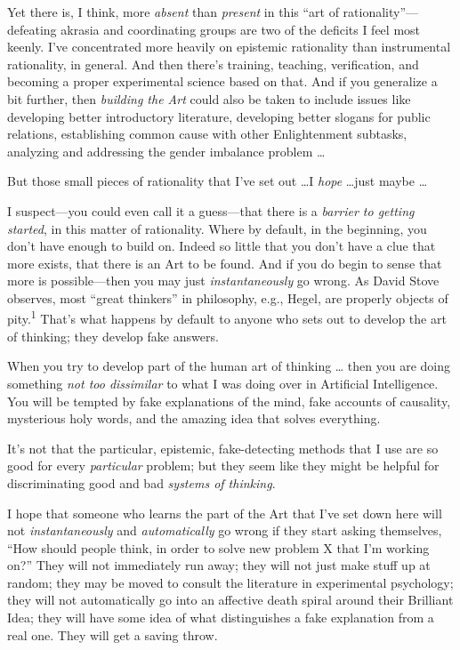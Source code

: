 {
 Yet there is, I think, more \textit{absent} than \textit{present}
in this ``art of
rationality''---defeating akrasia and coordinating
groups are two of the deficits I feel most keenly. I've
concentrated more heavily on epistemic rationality than instrumental
rationality, in general. And then there's training,
teaching, verification, and becoming a proper experimental science
based on that. And if you generalize a bit further, then
\textit{building the Art} could also be taken to include issues like
developing better introductory literature, developing better slogans
for public relations, establishing common cause with other
Enlightenment subtasks, analyzing and addressing the gender imbalance
problem \ldots}

{
 But those small pieces of rationality that I've
set out \ldots I \textit{hope} \ldots just maybe \ldots}

{
 I suspect---you could even call it a guess---that there is a
\textit{barrier to getting started}, in this matter of rationality.
Where by default, in the beginning, you don't have
enough to build on. Indeed so little that you don't
have a clue that more exists, that there is an Art to be found. And if
you do begin to sense that more is possible---then you may just
\textit{instantaneously} go wrong. As David Stove observes, most
``great thinkers'' in philosophy,
e.g., Hegel, are properly objects of pity.\textsuperscript{1}
That's what happens by default to anyone who sets out
to develop the art of thinking; they develop fake answers.}

{
 When you try to develop part of the human art of thinking \ldots
then you are doing something \textit{not too dissimilar} to what I was
doing over in Artificial Intelligence. You will be tempted by fake
explanations of the mind, fake accounts of causality, mysterious holy
words, and the amazing idea that solves everything.}

{
 It's not that the particular, epistemic,
fake-detecting methods that I use are so good for every
\textit{particular} problem; but they seem like they might be helpful
for discriminating good and bad \textit{systems of thinking}.}

{
 I hope that someone who learns the part of the Art that
I've set down here will not \textit{instantaneously}
and \textit{automatically} go wrong if they start asking themselves,
``How should people think, in order to solve new
problem X that I'm working on?'' They
will not immediately run away; they will not just make stuff up at
random; they may be moved to consult the literature in experimental
psychology; they will not automatically go into an affective death
spiral around their Brilliant Idea; they will have some idea of what
distinguishes a fake explanation from a real one. They will get a
saving throw.}

